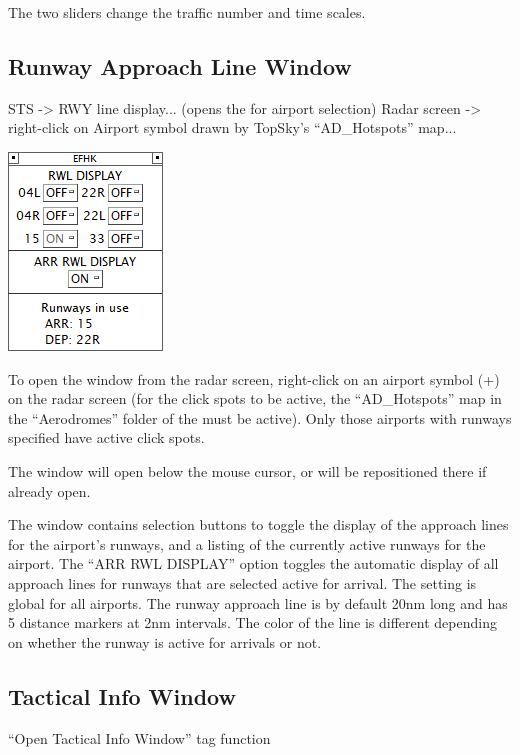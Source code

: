 \documentclass[11pt,a4paper]{memoir}
\begin{document}
The two sliders change the traffic number and time scales.

\subsection{Runway Approach Line Window}
\label{win:ralw}

\textit{} STS -> RWY line display... (opens the \textit{} for airport selection)
Radar screen -> right-click on Airport symbol drawn by TopSky’s “AD\_Hotspots” map...

\includegraphics{img/rwydsp.png}

To open the window from the radar screen, right-click on an airport symbol (+) on the radar screen (for the click spots to be active, the “AD\_Hotspots” map in the “Aerodromes” folder of the \textit{} must be active). Only those airports with runways specified have active click spots.

The window will open below the mouse cursor, or will be repositioned there if already open.

The window contains selection buttons to toggle the display of the approach lines for the airport’s runways, and a listing of the currently active runways for the airport. The “ARR RWL DISPLAY” option toggles the automatic display of all approach lines for runways that are selected active for arrival. The setting is global for all airports. The runway approach line is by default 20nm long and has 5 distance markers at 2nm intervals. The color of the line is different depending on whether the runway is active for arrivals or not.

\subsection{Tactical Info Window}
\label{win:tiw}

“Open Tactical Info Window” tag function
\end{document}
